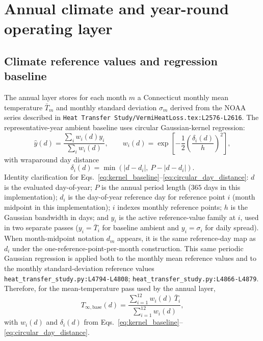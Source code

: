 \documentclass[11pt]{article}
\newcommand{\srcref}[1]{\nolinkurl{#1}}
\newcommand{\filepath}[1]{\nolinkurl{#1}}
\begin{document}
\section{Annual climate and year-round operating layer}

\subsection{Climate reference values and regression baseline}
The annual layer stores for each month \(m\) a Connecticut monthly mean temperature \(\bar T_m\) and monthly standard deviation \(\sigma_m\) derived from the NOAA series described in \filepath{Heat Transfer Study/VermiHeatLoss.tex:L2576-L2616}. The representative-year ambient baseline uses circular Gaussian-kernel regression:
\begin{equation}
\label{eq:kernel_baseline}
\hat y(d)=\frac{\sum_i w_i(d)y_i}{\sum_i w_i(d)},
\qquad
w_i(d)=\exp\!\left[-\frac{1}{2}\left(\frac{\delta_i(d)}{h}\right)^2\right],
\end{equation}
with wraparound day distance
\begin{equation}
\label{eq:circular_day_distance}
\delta_i(d)=\min\!\left(|d-d_i|,\ P-|d-d_i|\right).
\end{equation}
Identity clarification for Eqs.~\eqref{eq:kernel_baseline}--\eqref{eq:circular_day_distance}: \(d\) is the evaluated day-of-year; \(P\) is the annual period length (\(365\) days in this implementation); \(d_i\) is the day-of-year reference day for reference point \(i\) (month midpoint in this implementation); \(i\) indexes monthly reference points; \(h\) is the Gaussian bandwidth in days; and \(y_i\) is the active reference-value family at \(i\), used in two separate passes (\(y_i=\bar T_i\) for baseline ambient and \(y_i=\sigma_i\) for daily spread). When month-midpoint notation \(d_m\) appears, it is the same reference-day map as \(d_i\) under the one-reference-point-per-month construction.
This same periodic Gaussian regression is applied both to the monthly mean reference values and to the monthly standard-deviation reference values \srcref{heat_transfer_study.py:L4794-L4808}; \srcref{heat_transfer_study.py:L4866-L4879}.
Therefore, for the mean-temperature pass used by the annual layer,
\begin{equation}
\label{eq:baseline_ambient_explicit}
T_{\infty,\mathrm{base}}(d)=\frac{\sum_{i=1}^{12} w_i(d)\,\bar T_i}{\sum_{i=1}^{12} w_i(d)},
\end{equation}
with \(w_i(d)\) and \(\delta_i(d)\) from Eqs.~\eqref{eq:kernel_baseline}--\eqref{eq:circular_day_distance}.
\end{document}
